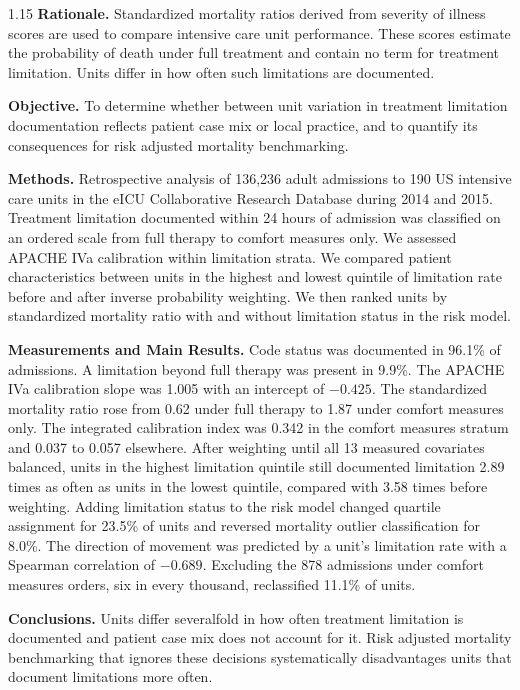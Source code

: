 \documentclass[12pt,a4paper]{article}
\begin{document}
\begin{spacing}{1.15}
\noindent\textbf{Rationale.} Standardized mortality ratios derived from severity
of illness scores are used to compare intensive care unit performance. These
scores estimate the probability of death under full treatment and contain no
term for treatment limitation. Units differ in how often such limitations are
documented.

\noindent\textbf{Objective.} To determine whether between unit variation in
treatment limitation documentation reflects patient case mix or local practice,
and to quantify its consequences for risk adjusted mortality benchmarking.

\noindent\textbf{Methods.} Retrospective analysis of 136{,}236 adult admissions
to 190 US intensive care units in the eICU Collaborative Research Database
during 2014 and 2015. Treatment limitation documented within 24 hours of
admission was classified on an ordered scale from full therapy to comfort
measures only. We assessed APACHE IVa calibration within limitation strata. We
compared patient characteristics between units in the highest and lowest
quintile of limitation rate before and after inverse probability weighting. We
then ranked units by standardized mortality ratio with and without limitation
status in the risk model.

\noindent\textbf{Measurements and Main Results.} Code status was documented in
96.1\% of admissions. A limitation beyond full therapy was present in 9.9\%. The
APACHE IVa calibration slope was 1.005 with an intercept of $-0.425$. The
standardized mortality ratio rose from 0.62 under full therapy to 1.87 under
comfort measures only. The integrated calibration index was 0.342 in the comfort
measures stratum and 0.037 to 0.057 elsewhere. After weighting until all 13
measured covariates balanced, units in the highest limitation quintile still
documented limitation 2.89 times as often as units in the lowest quintile,
compared with 3.58 times before weighting. Adding limitation status to the risk
model changed quartile assignment for 23.5\% of units and reversed mortality
outlier classification for 8.0\%. The direction of movement was predicted by a
unit's limitation rate with a Spearman correlation of $-0.689$. Excluding the 878
admissions under comfort measures orders, six in every thousand, reclassified
11.1\% of units.

\noindent\textbf{Conclusions.} Units differ severalfold in how often treatment
limitation is documented and patient case mix does not account for it. Risk
adjusted mortality benchmarking that ignores these decisions systematically
disadvantages units that document limitations more often.
\end{spacing}
\end{document}
